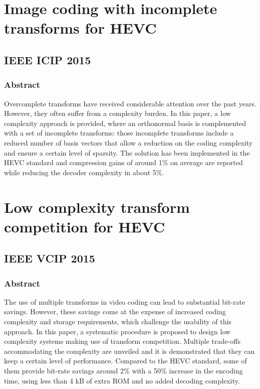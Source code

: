 \documentclass[11pt,a4paper,openright,twoside]{book}
\numberwithin{equation}{section} %
\numberwithin{figure}{section} %
\numberwithin{table}{section} %
\begin{document}
\section*{Image coding with incomplete transforms for HEVC}
\label{sec:image_coding_with_incomplete_transforms_for_hevc}

\subsection*{IEEE ICIP 2015}
\label{sub:ieee_icip_2015_it}

\subsubsection*{Abstract}
\label{ssub:it_bstract}

Overcomplete transforms have received considerable attention over the past
years.
However, they often suffer from a complexity burden.
In this paper, a low complexity approach is provided, where an orthonormal
basis is complemented with a set of incomplete transforms: those incomplete
transforms include a reduced number of basis vectors that allow a reduction on
the coding complexity and ensure a certain level of sparsity.
The solution has been implemented in the \acs{HEVC}  standard and compression
gains of around 1\% on average are reported while reducing the decoder
complexity in about 5\%.

\section*{Low complexity transform competition for HEVC}
\label{sec:low_complexity_transform_competition_for_hevc}

\subsection*{IEEE VCIP 2015}
\label{sub:ieee_vcip_2015}

\subsubsection*{Abstract}
\label{ssub:dtt_abstract}

The use of multiple transforms in video coding can lead to substantial
bit-rate savings.
However, these savings come at the expense of increased coding complexity and
storage requirements, which challenge the usability of this approach.
In this paper, a systematic procedure is proposed to design low complexity
systems making use of transform competition.
Multiple trade-offs accommodating the complexity are unveiled and it is
demonstrated that they can keep a certain level of performance.
Compared to the \acs{HEVC} standard, some of them provide bit-rate savings
around 2\% with a 50\% increase in the encoding time, using less than 4 kB of
extra ROM and no added decoding complexity.
\end{document}
